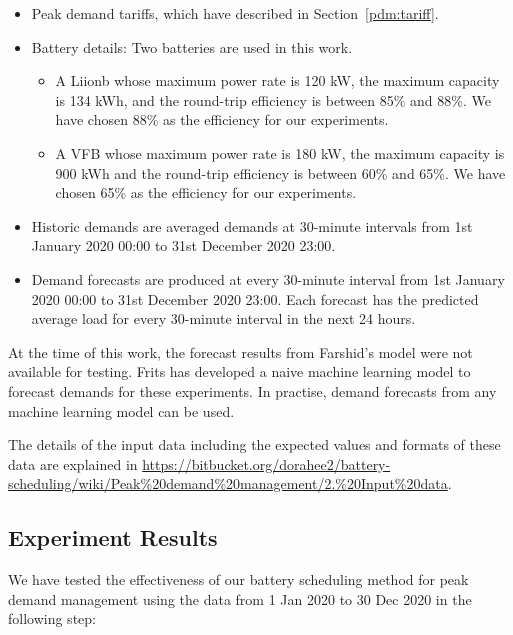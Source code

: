 \begin{itemize}
	\item Peak demand tariffs, which have described in Section~\ref{pdm:tariff}.
	
	\item Battery details: Two batteries are used in this work.
	\begin{itemize}
		\item  A \gls{Liionb} whose maximum power rate is 120 kW, the maximum capacity is 134 kWh, and the round-trip efficiency is between 85\% and 88\%. We have chosen 88\% as the efficiency for our experiments. 
		
		\item A \gls{VFB} whose maximum power rate is 180 kW, the maximum capacity is 900 kWh and the round-trip efficiency is between 60\% and 65\%. We have chosen 65\% as the efficiency for our experiments. 
	\end{itemize}

	\item Historic demands are averaged demands at 30-minute intervals from 1st January 2020 00:00 to 31st December 2020 23:00.

	\item Demand forecasts are produced at every 30-minute interval from 1st January 2020 00:00 to 31st December 2020 23:00. Each forecast has the predicted average load for every 30-minute interval in the next 24 hours. 
	
\end{itemize}

At the time of this work, the forecast results from Farshid's model were not available for testing. Frits has developed a naive machine learning model to forecast demands for these experiments. 
In practise, demand forecasts from any machine learning model can be used. 

The details of the input data including the expected values and formats of these data are explained in
\url{https://bitbucket.org/dorahee2/battery-scheduling/wiki/Peak\%20demand\%20management/2.\%20Input\%20data}. 

\subsection{Experiment Results}

We have tested the effectiveness of our battery scheduling method for peak demand management using the data from 1 Jan 2020 to 30 Dec 2020 in the following step:

